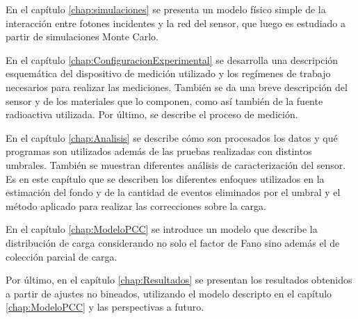 En el capítulo \ref{chap:simulaciones} se presenta un modelo físico simple de la interacción entre fotones incidentes y la red del sensor, que luego es estudiado a partir de simulaciones Monte Carlo.

En el capítulo \ref{chap:ConfiguracionExperimental} se desarrolla una descripción esquemática del dispositivo de medición utilizado y los regímenes de trabajo necesarios para realizar las mediciones. También se da una breve descripción del sensor y de los materiales que lo componen, como así también de la fuente radioactiva utilizada. Por último, se describe el proceso de medición.

En el capítulo \ref{chap:Analisis} se describe cómo son procesados los datos y qué programas son utilizados además de las pruebas realizadas con distintos umbrales. También se muestran diferentes análisis de caracterización del sensor. Es en este capítulo que se describen los diferentes enfoques utilizados en la estimación del fondo y de la cantidad de eventos eliminados por el umbral y el método aplicado para realizar las correcciones sobre la carga.

En el capítulo \ref{chap:ModeloPCC} se introduce un modelo que describe la distribución de carga considerando no solo el factor de Fano sino además el de colección parcial de carga. 

Por último, en el capítulo \ref{chap:Resultados} se presentan los resultados obtenidos a partir de ajustes no bineados, utilizando el modelo descripto en el capítulo \ref{chap:ModeloPCC} y las perspectivas a futuro.


